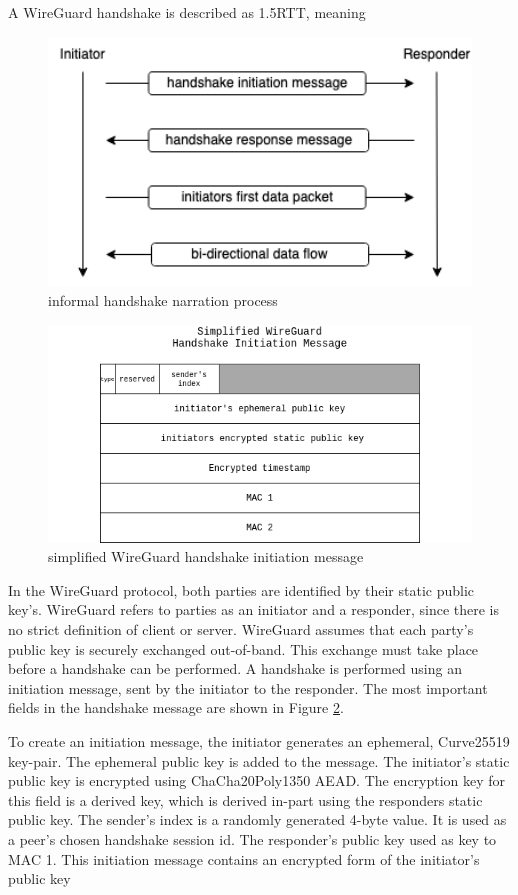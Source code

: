 \documentclass [11pt, proquest] {uwthesis}[2020/02/24]
\begin{document}
A WireGuard handshake is described as 1.5RTT, meaning

\begin{figure}[ht]
\includegraphics[width=12cm]{paper/images/handshake_process.drawio.png}
\caption{informal handshake narration process}
\label{fig:handshake_process}
\end{figure}


\label{handshake_message}

\begin{figure}[ht]
\includegraphics[width=12cm]{paper/images/Wg_hand_init.drawio.png}
\caption{simplified WireGuard handshake initiation message}
\label{fig:hand_init}
\end{figure}
In the WireGuard protocol, both parties are identified by their static public key's. WireGuard refers to parties as an initiator and a responder, since there is no strict definition of client or server. WireGuard assumes that each party's public key is securely exchanged out-of-band. This exchange must take place before a handshake can be performed. A handshake is performed using an initiation message, sent by the initiator to the responder. The most important fields in the handshake message are shown in Figure \ref{fig:hand_init}.

To create an initiation message, the initiator generates an ephemeral, Curve25519 key-pair. The ephemeral public key is added to the message. The initiator's static public key is encrypted using ChaCha20Poly1350 AEAD. The encryption key for this field is a derived key, which is derived in-part using the responders static public key.
The sender's index is a randomly generated 4-byte value. It is used as a peer's chosen handshake session id.
The responder's public key used as key to MAC 1. This initiation message contains an encrypted form of the initiator's public key
\end{document}
